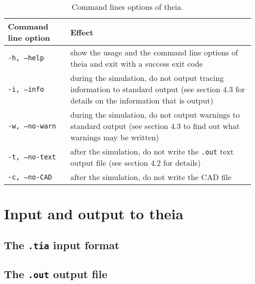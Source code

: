 \documentclass{article}
\renewcommand{\tt}[1]{\texttt{#1}}
\begin{document}
\begin{table}[h]
\begin{center}
\begin{tabular}{| p{4cm} | p{10cm} |}
\hline
\textbf{Command line option} & \textbf{Effect} \\
\hline \hline
\tt{-h, --help} & show the usage and the command line options of theia and exit with a success exit code\\
\hline
\tt{-i, --info} & during the simulation, do not output tracing information to standard output (see section 4.3 for details on the information that is output)\\
\hline
\tt{-w, --no-warn} & during the simulation, do not output warnings to standard output (see section 4.3 to find out what warnings may be written)\\
\hline
\tt{-t, --no-text} & after the simulation, do not write the \tt{.out} text output file (see section 4.2 for details)\\
\hline
\tt{-c, --no-CAD} & after the simulation, do not write the CAD file\\
\hline
\end{tabular}
\end{center}
\label{option}
\caption{Command lines options of theia.}
\end{table}

\section{Input and output to theia}
\subsection{The \tt{.tia} input format}

\subsection{The \tt{.out} output file}
\end{document}
